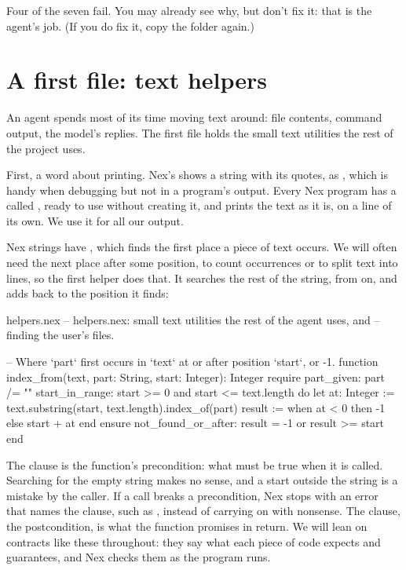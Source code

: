 Four of the seven fail. You may already see why, but don't fix it: that is
the agent's job. (If you do fix it, copy the folder again.)

\section{A first file: text helpers}

An agent spends most of its time moving text around: file contents,
command output, the model's replies. The first file holds the small text
utilities the rest of the project uses.

First, a word about printing. Nex's  shows a string with its
quotes, as , which is handy when debugging but not in a
program's output. Every Nex program has a  called
, ready to use without creating it, and
 prints the text as it is, on a line of
its own. We use it for all our output.

Nex strings have , which finds the first place a piece of
text occurs. We will often need the next place after some position, to
count occurrences or to split text into lines, so the first helper does
that. It searches the rest of the string, from  on, and adds
 back to the position it finds:

\begin{newfile}{helpers.nex}
-- helpers.nex: small text utilities the rest of the agent uses, and
-- finding the user's files.

-- Where `part` first occurs in `text` at or after position `start`, or -1.
function index_from(text, part: String, start: Integer): Integer
require
  part_given: part /= ""
  start_in_range: start >= 0 and start <= text.length
do
  let at: Integer := text.substring(start, text.length).index_of(part)
  result := when at < 0 then -1 else start + at end
ensure
  not_found_or_after: result = -1 or result >= start
end
\end{newfile}

The  clause is the function's precondition: what must be true
when it is called. Searching for the empty string makes no sense, and a
start outside the string is a mistake by the caller. If a call breaks a
precondition, Nex stops with an error that names the clause, such as
, instead of carrying on with
nonsense. The  clause, the postcondition, is what the function
promises in return. We will lean on contracts like these throughout: they
say what each piece of code expects and guarantees, and Nex checks them as
the program runs.

